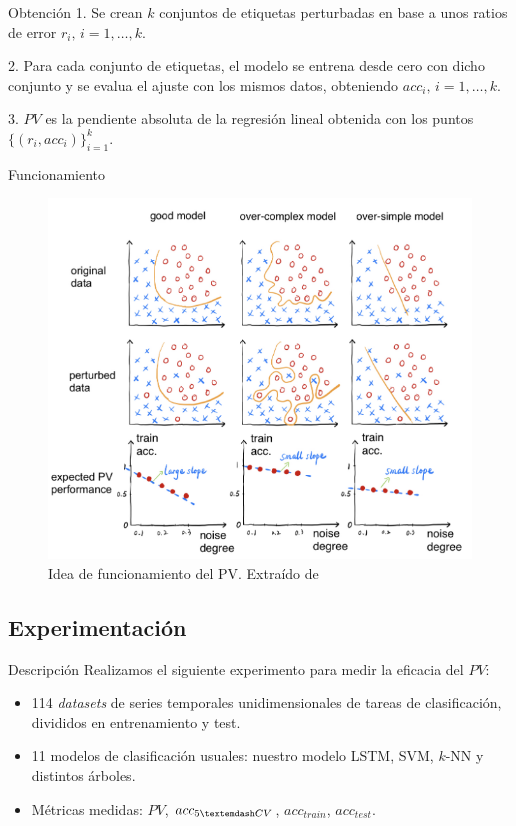 \documentclass[spanish]{beamer}
\begin{document}
\begin{frame}{Obtención}
  1. Se crean $k$ conjuntos de etiquetas perturbadas en base a unos ratios de error $r_i, \, i = 1, \ldots, k$.
  \pause

  2. Para cada conjunto de etiquetas, el modelo se entrena desde cero con dicho conjunto y se evalua el ajuste con los mismos datos, obteniendo $acc_i, \, i = 1, \ldots, k$.
  \pause

  3. $PV$ es la pendiente absoluta de la regresión lineal obtenida con los puntos $\{(r_i, acc_i)\}_{i = 1}^k$.
\end{frame}

\begin{frame}{Funcionamiento}
  \begin{figure}
    \centering
    \includegraphics[width=.6\textwidth]{img/idea-pv}
    \caption{Idea de funcionamiento del PV. Extraído de \cite{pv}}
  \end{figure}
\end{frame}

\subsection{Experimentación}

\begin{frame}{Descripción}
  Realizamos el siguiente experimento para medir la eficacia del $PV$:
  \begin{itemize}
    \item 114 \emph{datasets} de series temporales unidimensionales de tareas de clasificación, divididos en entrenamiento y test.
    \item 11 modelos de clasificación usuales: nuestro modelo LSTM, SVM, $k$-NN y distintos árboles.
    \item Métricas medidas: $PV$, $acc_{5\textemdash CV}$, $acc_{train}$, $acc_{test}$.
  \end{itemize}
\end{frame}
\end{document}
